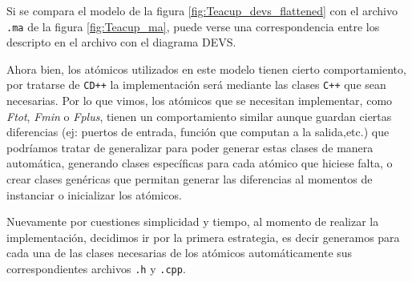 Si se compara el modelo de la figura \ref{fig:Teacup_devs_flattened} con el archivo \texttt{.ma} de la figura \ref{fig:Teacup_ma}, puede verse una correspondencia entre los descripto en el archivo con el diagrama DEVS.

Ahora bien, los atómicos utilizados en este modelo tienen cierto comportamiento, por tratarse de \texttt{CD++} la implementación será mediante las clases \texttt{C++} que sean necesarias. Por lo que vimos, los atómicos que se necesitan implementar, como \textit{Ftot}, \textit{Fmin} o \textit{Fplus}, tienen un comportamiento similar aunque guardan ciertas diferencias (ej: puertos de entrada, función que computan a la salida,etc.) que podríamos tratar de generalizar para poder generar estas clases de manera automática, generando clases específicas para cada atómico que hiciese falta, o crear clases genéricas que permitan generar las diferencias al momentos de instanciar o inicializar los atómicos. 

Nuevamente por cuestiones simplicidad y tiempo, al momento de realizar la implementación, decidimos ir por la primera estrategia, es decir generamos para cada una de las clases necesarias de los atómicos automáticamente sus correspondientes archivos \texttt{.h} y \texttt{.cpp}.

